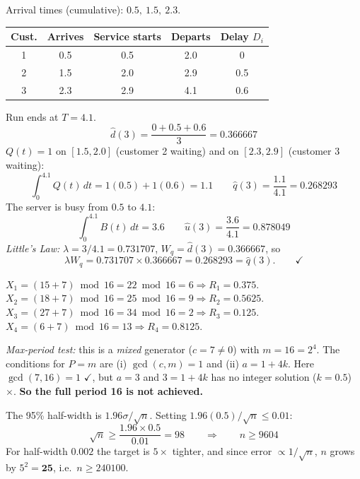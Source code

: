 \begin{probbox}
 Arrival times (cumulative): $0.5,\ 1.5,\ 2.3$.
\begin{center}\small
\begin{tabular}{@{}ccccc@{}}
\toprule
Cust. & Arrives & Service starts & Departs & Delay $D_i$\\
\midrule
1 & 0.5 & 0.5 & 2.0 & 0\\
2 & 1.5 & 2.0 & 2.9 & 0.5\\
3 & 2.3 & 2.9 & 4.1 & 0.6\\
\bottomrule
\end{tabular}
\end{center}
Run ends at $T = 4.1$.
\[
\hat d(3) = \frac{0+0.5+0.6}{3} = 0.366667
\]
$Q(t)=1$ on $[1.5,2.0]$ (customer 2 waiting) and on $[2.3,2.9]$ (customer 3 waiting):
\[
\int_0^{4.1}Q(t)\,dt = 1(0.5)+1(0.6) = 1.1 \qquad \hat q(3) = \frac{1.1}{4.1} = 0.268293
\]
The server is busy from $0.5$ to $4.1$:
\[
\int_0^{4.1}B(t)\,dt = 3.6 \qquad \hat u(3) = \frac{3.6}{4.1} = 0.878049
\]
\emph{Little's Law:} $\lambda = 3/4.1 = 0.731707$, $W_q = \hat d(3) = 0.366667$, so
\[
\lambda W_q = 0.731707 \times 0.366667 = 0.268293 = \hat q(3). \qquad\checkmark
\]

 $X_1 = (15+7)\bmod16 = 22\bmod16 = 6 \Rightarrow R_1 = 0.375$.
$X_2 = (18+7)\bmod16 = 25\bmod16 = 9 \Rightarrow R_2 = 0.5625$.
$X_3 = (27+7)\bmod16 = 34\bmod16 = 2 \Rightarrow R_3 = 0.125$.
$X_4 = (6+7)\bmod16 = 13 \Rightarrow R_4 = 0.8125$.

\emph{Max-period test:} this is a \emph{mixed} generator ($c = 7 \neq 0$) with $m = 16 = 2^4$. The conditions for $P = m$ are (i) $\gcd(c,m)=1$ and (ii) $a = 1+4k$. Here $\gcd(7,16)=1$ $\checkmark$, but $a = 3$ and $3 = 1+4k$ has no integer solution ($k = 0.5$) $\times$. \textbf{So the full period 16 is not achieved.}

 The 95\% half-width is $1.96\sigma/\sqrt n$. Setting $1.96(0.5)/\sqrt n \le 0.01$:
\[
\sqrt n \ge \frac{1.96\times0.5}{0.01} = 98 \qquad\Rightarrow\qquad n \ge 9604
\]
For half-width $0.002$ the target is $5\times$ tighter, and since error $\propto 1/\sqrt n$, $n$ grows by $5^2 = \mathbf{25}$, i.e.\ $n \ge 240100$.
\end{probbox}
